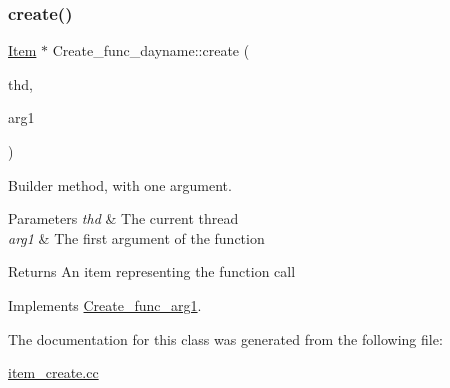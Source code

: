 \subsubsection{\texorpdfstring{create()}{create()}}
{\footnotesize\ttfamily \mbox{\hyperlink{classItem}{Item}} $\ast$ Create\+\_\+func\+\_\+dayname\+::create (\begin{DoxyParamCaption}\item[{T\+HD $\ast$}]{thd,  }\item[{\mbox{\hyperlink{classItem}{Item}} $\ast$}]{arg1 }\end{DoxyParamCaption})\hspace{0.3cm}{\ttfamily [virtual]}}

Builder method, with one argument. 
\begin{DoxyParams}{Parameters}
{\em thd} & The current thread \\
\hline
{\em arg1} & The first argument of the function \\
\hline
\end{DoxyParams}
\begin{DoxyReturn}{Returns}
An item representing the function call 
\end{DoxyReturn}


Implements \mbox{\hyperlink{classCreate__func__arg1_a3e9a98f755cd82c3e762e334c955a8c9}{Create\+\_\+func\+\_\+arg1}}.



The documentation for this class was generated from the following file\+:\begin{DoxyCompactItemize}
\item 
\mbox{\hyperlink{item__create_8cc}{item\+\_\+create.\+cc}}\end{DoxyCompactItemize}
